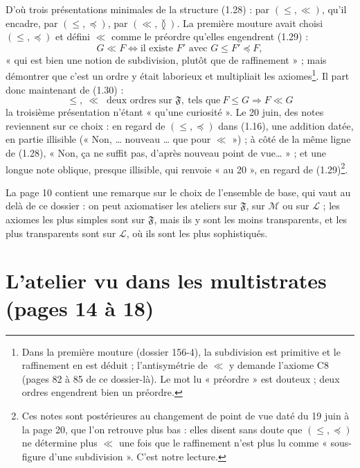 \documentclass[11pt,a4paper]{article}
\begin{document}
D'où trois présentations minimales de la structure (1.28) : par $(\leq, \ll)$,
qu'il encadre, par $(\leq, \preccurlyeq)$, par $(\ll, \between)$. La première
mouture avait choisi $(\leq, \preccurlyeq)$ et défini $\ll$ comme le préordre
qu'elles engendrent (1.29) :
\[
G \ll F \iff \text{il existe } F' \text{ avec } G \leq F' \preccurlyeq F ,
\]
« qui est bien une notion de subdivision, plutôt que de raffinement » ; mais
démontrer que c'est un ordre y était laborieux et multipliait les
axiomes\footnote{Dans la première mouture (dossier 156-4), la subdivision est
primitive et le raffinement en est déduit ; l'antisymétrie de $\ll$ y demande
l'axiome C8 (pages 82 à 85 de ce dossier-là). Le mot lu « préordre » est
douteux ; deux ordres engendrent bien un préordre.}. Il part donc maintenant de
(1.30) :
\[
\boxed{\ \leq,\ \ll \ \text{ deux ordres sur } \mathfrak{F}, \ \text{tels que}
\ F \leq G \Rightarrow F \ll G\ }
\]
la troisième présentation n'étant « qu'une curiosité ». Le 20 juin, des notes
reviennent sur ce choix : en regard de $(\leq, \preccurlyeq)$ dans (1.16), une
addition datée, en partie illisible (« Non, … nouveau … que pour $\ll$ ») ; à
côté de la même ligne de (1.28), « Non, ça ne suffit pas, d'après nouveau point
de vue… » ; et une longue note oblique, presque illisible, qui renvoie « au 20 »,
en regard de (1.29)\footnote{Ces notes sont postérieures au changement de point de vue daté du 19 juin à la
page 20, que l'on retrouve plus bas : elles disent sans doute que $(\leq,
\preccurlyeq)$ ne détermine plus $\ll$ une fois que le raffinement n'est plus
lu comme « sous-figure d'une subdivision ». C'est notre lecture.}.

La page 10 contient une remarque sur le choix de l'ensemble de base, qui vaut au
delà de ce dossier : on peut axiomatiser les ateliers sur $\mathfrak{F}$, sur
$\mathcal{M}$ ou sur $\mathcal{L}$ ; les axiomes les plus simples sont sur
$\mathfrak{F}$, mais ils y sont les moins transparents, et les plus
transparents sont sur $\mathcal{L}$, où ils sont les plus sophistiqués.

\section*{L'atelier vu dans les multistrates (pages 14 à 18)}
\end{document}
